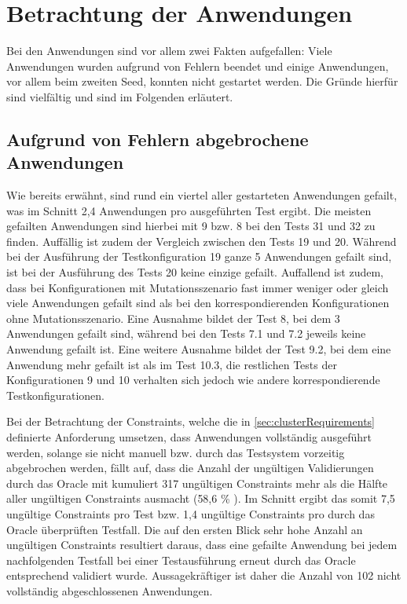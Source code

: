\section{Betrachtung der Anwendungen}
\label{sec:appEval}

Bei den Anwendungen sind vor allem zwei Fakten aufgefallen:
Viele Anwendungen wurden aufgrund von Fehlern beendet und einige Anwendungen, vor allem beim zweiten Seed, konnten nicht gestartet werden.
Die Gründe hierfür sind vielfältig und sind im Folgenden erläutert.

\subsection{Aufgrund von Fehlern abgebrochene Anwendungen}
\label{sec:failedApps}

Wie bereits erwähnt, sind rund ein viertel aller gestarteten Anwendungen gefailt, was im Schnitt 2,4 Anwendungen pro ausgeführten Test ergibt.
Die meisten gefailten Anwendungen sind hierbei mit 9 bzw. 8 bei den Tests 31 und 32 zu finden.
Auffällig ist zudem der Vergleich zwischen den Tests 19 und 20.
Während bei der Ausführung der Testkonfiguration 19 ganze 5 Anwendungen gefailt sind, ist bei der Ausführung des Tests 20 keine einzige gefailt.
Auffallend ist zudem, dass bei Konfigurationen mit Mutationsszenario fast immer weniger oder gleich viele Anwendungen gefailt sind als bei den korrespondierenden Konfigurationen ohne Mutationsszenario.
Eine Ausnahme bildet der Test 8, bei dem 3 Anwendungen gefailt sind, während bei den Tests 7.1 und 7.2 jeweils keine Anwendung gefailt ist.
Eine weitere Ausnahme bildet der Test 9.2, bei dem eine Anwendung mehr gefailt ist als im Test 10.3, die restlichen Tests der Konfigurationen 9 und 10 verhalten sich jedoch wie andere korrespondierende Testkonfigurationen.

Bei der Betrachtung der Constraints, welche die in \autoref{sec:clusterRequirements} definierte Anforderung umsetzen, dass Anwendungen vollständig ausgeführt werden, solange sie nicht manuell bzw. durch das Testsystem vorzeitig abgebrochen werden, fällt auf, dass die Anzahl der ungültigen Validierungen durch das Oracle mit kumuliert 317 ungültigen Constraints mehr als die Hälfte aller ungültigen Constraints ausmacht (58,6 \% ).
Im Schnitt ergibt das somit 7,5 ungültige Constraints pro Test bzw. 1,4 ungültige Constraints pro durch das Oracle überprüften Testfall.
Die auf den ersten Blick sehr hohe Anzahl an ungültigen Constraints resultiert daraus, dass eine gefailte Anwendung bei jedem nachfolgenden Testfall bei einer Testausführung erneut durch das Oracle entsprechend validiert wurde.
Aussagekräftiger ist daher die Anzahl von 102 nicht vollständig abgeschlossenen Anwendungen.

